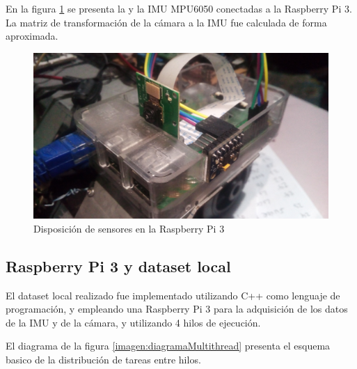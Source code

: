 En la figura \ref{imagen:Raspbery} se presenta la   y la IMU MPU6050 conectadas a la Raspberry Pi 3.  La matriz de transformación de la cámara a la IMU fue calculada de forma aproximada.



\begin{figure}[H]
	\centering		\includegraphics[width=0.7\linewidth]{imagenes/prototipo/Raspberry}
	\caption[Disposición de sensores en la Raspberry Pi 3]{Disposición de sensores en la Raspberry Pi 3}
	\label{imagen:Raspbery}
\end{figure}


\subsection{Raspberry Pi 3 y dataset local}

El dataset local realizado fue implementado utilizando C++ como lenguaje de programación, y empleando una Raspberry Pi 3 para la adquisición de los datos de la IMU y de la cámara, y utilizando 4 hilos de ejecución.

El diagrama de la figura \ref{imagen:diagramaMultithread} presenta el esquema basico de la distribución de tareas entre hilos.

